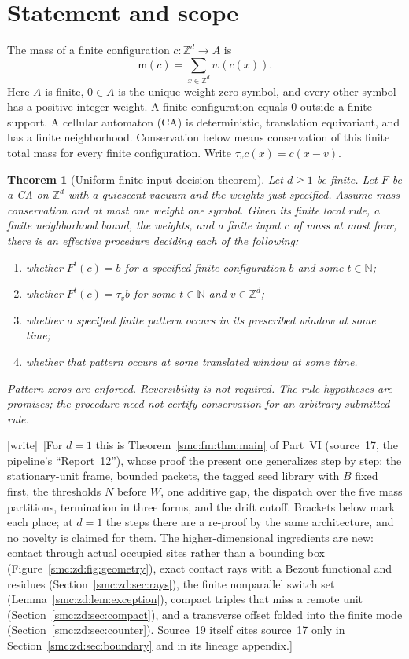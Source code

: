 \documentclass[11pt,letterpaper]{article}
\numberwithin{equation}{section}
\newtheorem{theorem}{Theorem}[section]
\theoremstyle{definition}
\theoremstyle{remark}
\newcommand{\Z}{\mathbb Z}
\newcommand{\NN}{\mathbb N}
\newcommand{\wtag}{\textup{[write]}}
\begin{document}
\section{Statement and scope}\label{smc:zd:sec:statement}
The mass of a finite configuration $c\colon\Z^d\to A$ is
\[
 \mathsf m(c)=\sum_{x\in\Z^d}w(c(x)).
\]
Here $A$ is finite, $0\in A$ is the unique weight zero symbol, and every other symbol has a positive integer weight. A finite configuration equals $0$ outside a finite support. A cellular automaton (CA) is deterministic, translation equivariant, and has a finite neighborhood. Conservation below means conservation of this finite total mass for every finite configuration. Write $\tau_v c(x)=c(x-v)$.

\begin{theorem}[Uniform finite input decision theorem]\label{smc:zd:thm:main}
Let $d\ge1$ be finite. Let $F$ be a CA on $\Z^d$ with a quiescent vacuum and the weights just specified. Assume mass conservation and at most one weight one symbol. Given its finite local rule, a finite neighborhood bound, the weights, and a finite input $c$ of mass at most four, there is an effective procedure deciding each of the following:
\begin{enumerate}
\item whether $F^t(c)=b$ for a specified finite configuration $b$ and some $t\in\NN$;
\item whether $F^t(c)=\tau_v b$ for some $t\in\NN$ and $v\in\Z^d$;
\item whether a specified finite pattern occurs in its prescribed window at some time;
\item whether that pattern occurs at some translated window at some time.
\end{enumerate}
Pattern zeros are enforced. Reversibility is not required. The rule hypotheses are promises; the procedure need not certify conservation for an arbitrary submitted rule.
\end{theorem}

\wtag\ [For $d=1$ this is Theorem~\ref{smc:fm:thm:main} of Part~VI (source~17, the pipeline's ``Report~12''), whose proof the present one generalizes step by step: the stationary-unit frame, bounded packets, the tagged seed library with $B$ fixed first, the thresholds $N$ before $W$, one additive gap, the dispatch over the five mass partitions, termination in three forms, and the drift cutoff. Brackets below mark each place; at $d=1$ the steps there are a re-proof by the same architecture, and no novelty is claimed for them. The higher-dimensional ingredients are new: contact through actual occupied sites rather than a bounding box (Figure~\ref{smc:zd:fig:geometry}), exact contact rays with a Bezout functional and residues (Section~\ref{smc:zd:sec:rays}), the finite nonparallel switch set (Lemma~\ref{smc:zd:lem:exception}), compact triples that miss a remote unit (Section~\ref{smc:zd:sec:compact}), and a transverse offset folded into the finite mode (Section~\ref{smc:zd:sec:counter}). Source~19 itself cites source~17 only in Section~\ref{smc:zd:sec:boundary} and in its lineage appendix.]
\end{document}
